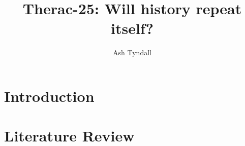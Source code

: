 \documentclass{cshonours}
\title{Therac-25: Will history repeat itself?}
\author{Ash Tyndall}
\begin{document}
\maketitle

\tableofcontents
\listoftables
\listoffigures

\chapter{Introduction}

\chapter{Literature Review}

\appendix


\end{document}
